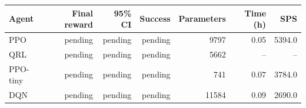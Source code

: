\begin{tabular}{lrrrrrr}
\toprule
Agent & Final reward & 95\% CI & Success & Parameters & Time (h) & SPS \\
\midrule
PPO & pending & pending & pending & 9797 & 0.05 & 5394.0 \\
QRL & pending & pending & pending & 5662 & -- & -- \\
PPO-tiny & pending & pending & pending & 741 & 0.07 & 3784.0 \\
DQN & pending & pending & pending & 11584 & 0.09 & 2690.0 \\
\bottomrule
\end{tabular}
